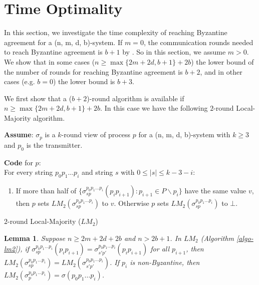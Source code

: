 \documentclass[11pt,conference,compsoc,onecolumn,romanappendices]{IEEEtran}
\newcommand{\tmstrong}[1]{\textbf{#1}}
\newenvironment{tmindent}{\begin{tmparmod}{1.0em}{1.0em}{0pt} }{\end{tmparmod}}
\newenvironment{tmparmod}[3]{\begin{list}{}{\setlength{\topsep}{0pt}\setlength{\leftmargin}{#1}\setlength{\rightmargin}{#2}\setlength{\parindent}{#3}\setlength{\listparindent}{\parindent}\setlength{\itemindent}{\parindent}\setlength{\parsep}{\parskip}} \item[]}{\end{list}}
\newtheorem{lemma}{Lemma}
\begin{document}
\section{Time Optimality}\label{sec-time}

In this section, we investigate the time complexity of reaching Byzantine
agreement for a (n, m, d, b)-system. If $m = 0$, the communication rounds
needed to reach Byzantine agreement is $b + 1$ by
\cite{fischer1982lower}. So in this section, we assume $m > 0$. We show that
in some cases ($n \geqslant \max \{ 2 m + 2 d, b + 1 \} + 2 b$) the lower
bound of the number of rounds for reaching Byzantine agreement is $b + 2$, and in other cases
(e.g. $b = 0$) the lower bound is $b + 3$.

We first show that a ($b + 2$)-round algorithm is available if $n \geqslant
\max \{ 2 m + 2 d, b + 1 \} + 2 b$. In this case we have the following $2$-round
Local-Majority algorithm.

\begin{algorithm}[H]
  {\tmstrong{Assume}}: $\sigma_p$ is a $k$-round view of process $p$ for a
  (n, m, d, b)-system with $k \geqslant 3$ and $p_0$ is the
  transmitter.{\hspace*{\fill}}

  {\tmstrong{Code}} for $p$:{\hspace*{\fill}}\\
  For every string $p_0 p_1 \ldots p_i$ and string $s$ with $0 \leqslant | s |
  \leqslant k - 3 - i$:
    \begin{tmindent}
      \begin{enumerate}
        \item If more than half of $\{ \sigma^{p_0 p_1 \ldots p_i}_{s p} (p_i p_{i+1}) : {p_{i+1} \in P \backslash p_{i}} \}$ have the same value $v$, then $p$ sets
        $L M_2 (\sigma^{p_0 p_1 \ldots p_i}_{s p})$ to $v$. Otherwise $p$
        sets $L M_2 (\sigma^{p_0 p_1 \ldots p_i}_{s p})$ to $\bot$.
      \end{enumerate}
    \end{tmindent}
  \caption{$2$-round Local-Majority ($L M_2$)\label{algo-lm2}}
\end{algorithm}

\begin{lemma}\label{lemma-lm2}
  Suppose $n \geqslant 2 m + 2 d + 2 b$ and $n > 2b + 1$.
  In $L M_2$ (Algorithm \ref{algo-lm2}),
  if $\sigma^{p_0 p_1 \ldots p_i}_{s p} (p_i p_{i+1}) = \sigma^{p_0 p_1 \ldots p_i}_{s' p'} (p_i p_{i+1})$ for all $p_{i+1}$, then $L M_2 (\sigma^{p_0 p_1 \ldots p_i}_{s p}) = L M_2 (\sigma^{p_0 p_1 \ldots p_i}_{s' p'})$.
  If $p_i$ is non-Byzantine, then $L M_2 (\sigma^{p_0 p_1 \ldots p_i}_{p}) = \sigma (p_0 p_1 \ldots p_i)$.
\end{lemma}
\end{document}

